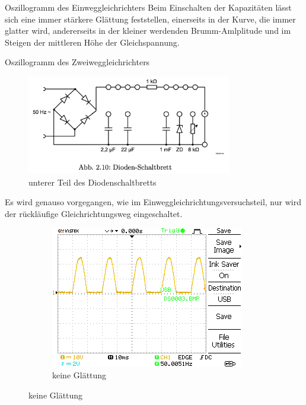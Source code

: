\documentclass{article}
\theoremstyle{definition}
\begin{document}
\begin{aufgabe}{Oszillogramm des Einweggleichrichters}
    Beim Einschalten der Kapazitäten lässt sich eine immer stärkere Glättung feststellen, einerseits in der Kurve, die immer glatter wird, andererseits in der kleiner werdenden Brumm-Amlplitude und im Steigen der mittleren Höhe der Gleichspannung.
\end{aufgabe}

\clearpage
\begin{aufgabe}{Oszillogramm des Zweiweggleichrichters}
    \aufbau
    \begin{figure}[H]
        \centering
        \includegraphics[width=0.8\textwidth]{figs/Aufbau4.png}
        \caption{unterer Teil des Diodenschaltbretts\cite{anleitung}}
        \label{aufbau4}
    \end{figure}
    Es wird genauso vorgegangen, wie im Einweggleichrichtungsversuchsteil, nur wird der rückläufige Gleichrichtungsweg eingeschaltet.
    \messwerte
    \begin{figure}[H]
        \begin{subfigure}[b]{0.49 \textwidth}
            \includegraphics[width=\textwidth]{MesswerteVersuch2/DS0003.png}
            \caption{keine Glättung}

\end{subfigure}
\end{figure}
\end{aufgabe}
\end{document}
